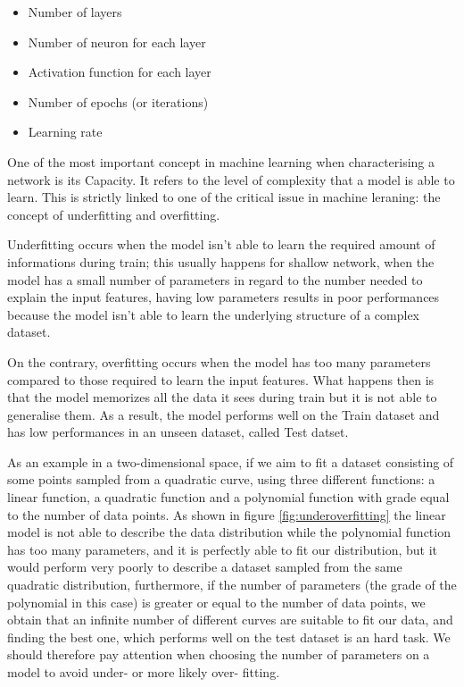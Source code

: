 \documentclass[a4paper,11pt]{article}
\begin{document}
\begin{itemize}
\item Number of layers
\item Number of neuron for each layer
\item Activation function for each layer
\item Number of epochs (or iterations)
\item Learning rate
\end{itemize}




One of the most important concept in machine learning when characterising a network is its Capacity.
It refers to the level of complexity that a model is able to learn.
This is strictly linked to one of the critical issue in machine leraning: the concept of underfitting and overfitting.

Underfitting occurs when the model isn't able to learn the required amount of informations during train; this usually happens for shallow network, when the model has a small number of parameters in regard to the number needed to explain the input features, having low parameters results in poor performances because the model isn't able to learn the underlying structure of a complex dataset.

On the contrary, overfitting occurs when the model has too many parameters compared to those required to learn the input features.
What happens then is that the model memorizes all the data it sees during train but it is not able to generalise them.
As a result, the model performs well on the Train dataset and has low performances in an unseen dataset, called Test datset.

As an example in a two-dimensional space, if we aim to fit a dataset consisting of some points sampled from a quadratic curve, using three different functions: a linear function, a quadratic function and a polynomial function with grade equal to the number of data points.
As shown in figure \ref{fig:underoverfitting} the linear model is not able to describe the data distribution while the polynomial function has too many parameters, and it is perfectly able to fit our distribution, but it would perform very poorly to describe a dataset sampled from the same quadratic distribution, furthermore, if the number of parameters (the grade of the polynomial in this case) is greater or equal to the number of data points, we obtain that an infinite number of different curves are suitable to fit our data, and finding the best one, which performs well on the test dataset is an hard task.
We should therefore pay attention when choosing the number of parameters on a model to avoid under- or more likely over- fitting.
\end{document}
